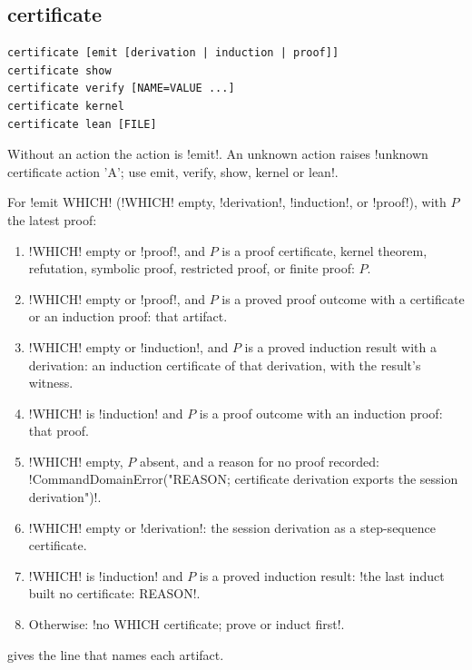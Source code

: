 \subsection{certificate}\label{sec:language-certificate}

\begin{lstlisting}[style=azx]
certificate [emit [derivation | induction | proof]]
certificate show
certificate verify [NAME=VALUE ...]
certificate kernel
certificate lean [FILE]
\end{lstlisting}
Without an action the action is \code!emit!. An unknown action raises \code!unknown certificate action 'A'; use emit, verify, show, kernel or lean!.

\begin{algorithm}\label{alg:language-emit}
\leavevmode
For \code!emit WHICH! (\code!WHICH! empty, \code!derivation!, \code!induction!, or \code!proof!), with $P$ the latest proof:
\begin{enumerate}
\item \code!WHICH! empty or \code!proof!, and $P$ is a proof certificate, kernel theorem, refutation, symbolic proof, restricted proof, or finite proof: $P$.
\item \code!WHICH! empty or \code!proof!, and $P$ is a proved proof outcome with a certificate or an induction proof: that artifact.
\item \code!WHICH! empty or \code!induction!, and $P$ is a proved induction result with a derivation: an induction certificate of that derivation, with the result's witness.
\item \code!WHICH! is \code!induction! and $P$ is a proof outcome with an induction proof: that proof.
\item \code!WHICH! empty, $P$ absent, and a reason for no proof recorded: \code!CommandDomainError("REASON; certificate derivation exports the session derivation")!.
\item \code!WHICH! empty or \code!derivation!: the session derivation as a step-sequence certificate.
\item \code!WHICH! is \code!induction! and $P$ is a proved induction result: \code!the last induct built no certificate: REASON!.
\item Otherwise: \code!no WHICH certificate; prove or induct first!.
\end{enumerate}
\end{algorithm}

 gives the line that names each artifact.


